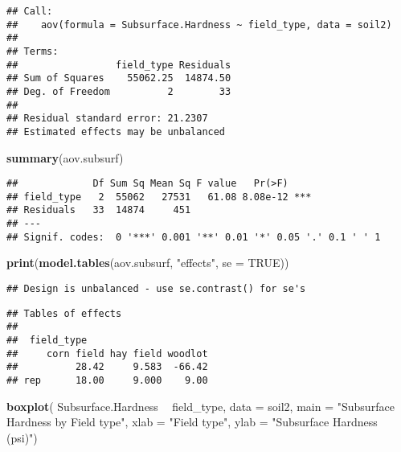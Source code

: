 \documentclass[]{article}
\newenvironment{Shaded}{\begin{snugshade}}{\end{snugshade}}
\newcommand{\KeywordTok}[1]{\textcolor[rgb]{0.13,0.29,0.53}{\textbf{#1}}}
\newcommand{\DataTypeTok}[1]{\textcolor[rgb]{0.13,0.29,0.53}{#1}}
\newcommand{\StringTok}[1]{\textcolor[rgb]{0.31,0.60,0.02}{#1}}
\newcommand{\OtherTok}[1]{\textcolor[rgb]{0.56,0.35,0.01}{#1}}
\newcommand{\OperatorTok}[1]{\textcolor[rgb]{0.81,0.36,0.00}{\textbf{#1}}}
\newcommand{\NormalTok}[1]{#1}
\begin{document}
\begin{verbatim}
## Call:
##    aov(formula = Subsurface.Hardness ~ field_type, data = soil2)
## 
## Terms:
##                 field_type Residuals
## Sum of Squares    55062.25  14874.50
## Deg. of Freedom          2        33
## 
## Residual standard error: 21.2307
## Estimated effects may be unbalanced
\end{verbatim}

\begin{Shaded}
\begin{Highlighting}[]
\KeywordTok{summary}\NormalTok{(aov.subsurf)}
\end{Highlighting}
\end{Shaded}

\begin{verbatim}
##             Df Sum Sq Mean Sq F value   Pr(>F)    
## field_type   2  55062   27531   61.08 8.08e-12 ***
## Residuals   33  14874     451                     
## ---
## Signif. codes:  0 '***' 0.001 '**' 0.01 '*' 0.05 '.' 0.1 ' ' 1
\end{verbatim}

\begin{Shaded}
\begin{Highlighting}[]
\KeywordTok{print}\NormalTok{(}\KeywordTok{model.tables}\NormalTok{(aov.subsurf, }\StringTok{"effects"}\NormalTok{, }\DataTypeTok{se =} \OtherTok{TRUE}\NormalTok{))}
\end{Highlighting}
\end{Shaded}

\begin{verbatim}
## Design is unbalanced - use se.contrast() for se's
\end{verbatim}

\begin{verbatim}
## Tables of effects
## 
##  field_type 
##     corn field hay field woodlot
##          28.42     9.583  -66.42
## rep      18.00     9.000    9.00
\end{verbatim}

\begin{Shaded}
\begin{Highlighting}[]
\KeywordTok{boxplot}\NormalTok{( Subsurface.Hardness }\OperatorTok{~}\StringTok{ }\NormalTok{field_type, }\DataTypeTok{data =}\NormalTok{ soil2, }\DataTypeTok{main =} \StringTok{"Subsurface Hardness by Field type"}\NormalTok{, }\DataTypeTok{xlab =} \StringTok{"Field type"}\NormalTok{, }\DataTypeTok{ylab =} \StringTok{"Subsurface Hardness (psi)"}\NormalTok{)}
\end{Highlighting}
\end{Shaded}
\end{document}

